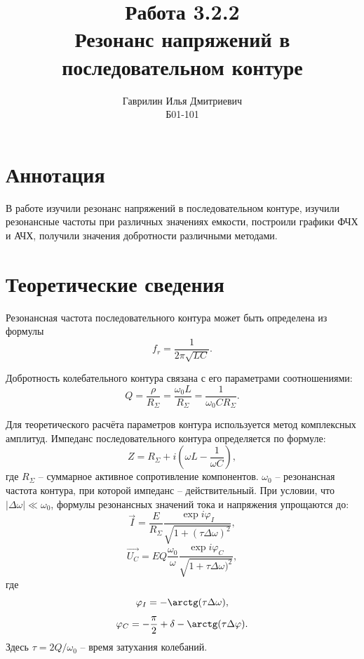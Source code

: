 \documentclass[a4paper, 12pt]{article}%
\author{Гаврилин Илья Дмитриевич \\
	Б01-101}
\title{\textbf{Работа 3.2.2 \\ 
		Резонанс напряжений в последовательном контуре}}
\begin{document}
	\maketitle
	\section{Аннотация}
	В работе изучили резонанс напряжений в последовательном контуре, изучили резонансные частоты при различных значениях емкости, построили графики ФЧХ и АЧХ, получили значения добротности различными методами.
	\section{Теоретические сведения}
	
	Резонансная частота последовательного контура может быть определена из формулы
	\begin{equation}\label{freq}
		f_r = \frac{1}{2 \pi \sqrt{L C}}.
	\end{equation}
	
	Добротность колебательного контура связана с его параметрами соотношениями:
	\begin{equation}\label{qual}
		Q = \frac{\rho}{R_\Sigma} = \frac{\omega_0 L}{R_\Sigma} = \frac{1}{\omega_0 C R_\Sigma}.
	\end{equation}
	
	Для теоретического расчёта параметров контура используется метод комплексных амплитуд. Импеданс последовательного контура определяется по формуле:
	\begin{equation}\label{импеданс}
		Z = R_\Sigma +i(\omega L - \frac{1}{\omega C}),
	\end{equation}
	где $ R_\Sigma $ -- суммарное активное сопротивление компонентов. $ \omega_0 $ -- резонансная частота контура, при которой импеданс -- действительный. При условии, что $ | \Delta \omega | \ll \omega_0 $, формулы резонансных значений тока и напряжения упрощаются до:
	\begin{equation}\label{Ires}
		\overrightarrow{I} = \frac{E}{R_\Sigma} \frac{\exp i\varphi_I}{\sqrt{1+(\tau \Delta \omega )^2}}, 
	\end{equation}
	\begin{equation}\label{Ures}
		\overrightarrow{U_C} = E Q \frac{\omega_0}{\omega} \frac{\exp i \varphi_C}{\sqrt{1+\tau \Delta \omega )^2}},
	\end{equation}
	где 
	\begin{equation*}
		\varphi_I = -\arctg (\tau \Delta \omega ), 
	\end{equation*}
	\begin{equation}\label{phi_c}
		\varphi_C = -\frac{\pi}{2} + \delta - \arctg (\tau \Delta \varphi ).
	\end{equation}
	Здесь $ \tau = 2 Q / \omega_0 $ -- время затухания колебаний.
	
\end{document}
